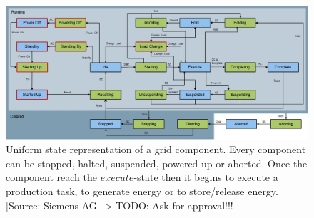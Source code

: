 %
\begin{figure}[h!]
\includegraphics[scale=.40]{images/StateMachine_EFlex}
%
%
\caption{Uniform state representation of a grid component. Every component can be stopped, halted, suspended, powered up or aborted. Once the component reach the $execute$-state then it begins to execute a production task, to generate energy or to store/release energy. [Source: Siemens AG]--> TODO: Ask for approval!!!}
\label{fig:state_chart}       %
\end{figure}



